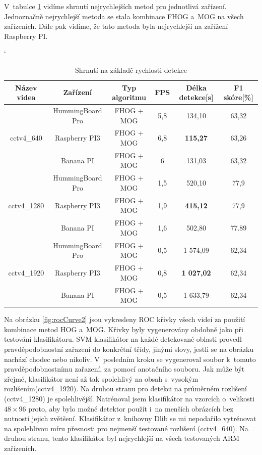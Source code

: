 V~tabulce \ref{sumSpeTab} vidíme shrnutí nejrychlejších metod pro jednotlivá zařízení. Jednoznačně nejrychlejší metoda se stala kombinace FHOG a~MOG na všech zařízeních. Dále pak vidíme, že tato metoda byla nejrychlejší na zařížení Raspberry PI.
\begin{table}[H]
\catcode`
\centering
\caption{Shrnutí na základě rychlosti detekce}
\label{sumSpeTab}
\begin{tabular}{|c|c|c|c|c|c|}
\hline
{Název videa}               &{Zařízení}          & Typ algoritmu & FPS & Délka detekce[s] & F1 skóre[\%]  \\  \hline
\multirow{3}{*}{cctv4\_640} & HummingBoard Pro   & FHOG + MOG     & 5,8 & 134,10                    &  63,32       \\ \cline{2-6}  
                            & Raspberry PI3      & FHOG + MOG     & 6,8 & \textbf{115,27}           &  63,26       \\ \cline{2-6}  
                            & Banana PI          & FHOG + MOG     & 6   & 131,03                    &  63,32       \\ \hline \hline   
\multirow{3}{*}{cctv4\_1280}& HummingBoard Pro   & FHOG + MOG     & 1,5 & 520,10                    &  77,9        \\ \cline{2-6}  
                            & Raspberry PI3      & FHOG + MOG     & 1,9 & \textbf{415,12}           &  77,9        \\ \cline{2-6}  
                            & Banana PI          & FHOG + MOG     & 1,6 &  502,80                   &  77.89       \\ \hline \hline    
\multirow{3}{*}{cctv4\_1920}& HummingBoard Pro   & FHOG + MOG     & 0,5 & 1 574,09                  &  62,34       \\ \cline{2-6}  
                            & Raspberry PI3      & FHOG + MOG     & 0,8 & \textbf{1 027,02}         &  62,34       \\ \cline{2-6}  
                            & Banana PI          & FHOG + MOG     & 0,5 &  1 633,79                 &  62,34       \\ \hline
\end{tabular}
\end{table}


Na obrázku \ref{fig:rocCurve2} jsou vykresleny ROC křivky všech videí za použití kombinace metod HOG a~MOG. Křivky byly vygenerovány obdobně jako při testování klasifikátoru. SVM klasifikátor na každé detekované oblasti provedl pravděpodobnostní zařazení do konkrétní třídy, jinými slovy, jestli se na obrázku nachází chodec nebo nikoliv. V~posledním kroku se vygeneroval  soubor k~tomuto pravděpodobnostnímu zařazení, za pomocí anotačního souboru. Jak může být zřejmé, klasifikátor není až tak spolehlivý na obsah s~vysokým rozlišením(cctv4\_1920). Na druhou stranu pro detekci na průměrném rozlišení (cctv4\_1280) je spolehlivější. Natrénoval jsem klasifikátor na vzorcích o~velikosti $48\times96$ proto, aby bylo možné detektor použít i~na menších obrázcích bez nutnosti jejich zvětšení. Klasifikátor z~knihovny Dlib se mi nepodařilo vytrénovat na spolehlivou míru přesnosti pro nejmenší testované rozlišení (cctv4\_640). Na druhou stranu, tento klasifikátor byl nejrychlejší na všech testovaných ARM zařízeních.

